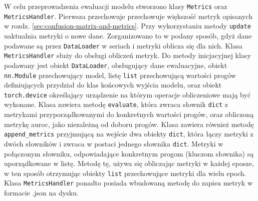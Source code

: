 W celu przeprowadzenia ewaluacji modelu stworzono klasy \texttt{Metrics} oraz \texttt{MetricsHandler}. Pierwsza przechowuje przechowuje większość metryk opisanych w rozdz. \ref{sec:confusion-matrix-and-metrics}. Przy wykorzystaniu metody \texttt{update} uaktualnia metryki o nowe dane. Zorganizowano to w podany sposób, gdyż dane podawane są przez \texttt{DataLoader} w seriach i metryki oblicza się dla nich. Klasa \texttt{MetricsHandler} służy do obsługi obliczeń metryk. Do metody inicjacyjnej klasy podawany jest obiekt \texttt{DataLoader}, obsługujący dane ewaluacyjne, obiekt \texttt{nn.Module} przechowujący model, listę \texttt{list} przechowującą wartości progów definiujących przydział do klas końcowych wyjścia modelu, oraz obiekt \texttt{torch.device} określający urządzenie na którym operacje obliczeniowe mają być wykonane. Klasa zawiera metodę \texttt{evaluate}, która zwraca słownik \texttt{dict} z metrykami przyporządkowanymi do konkretnych wartości progów, oraz obliczoną metrykę auroc, jako niezależną od doboru progów. Klasa zawiera również metodę \texttt{append\_metrics} przyjmującą na wejście dwa obiekty \texttt{dict}, która łączy metryki z dwóch słowników i zwraca w postaci jednego słownika \texttt{dict}. Metryki w połączonym słowniku, odpowiadające konkretnym progom (kluczom słownika) są uporządkowane w listę. Metodę tę, używa się obliczając metryki w każdej eposze, w ten sposób otrzymując obiekty \texttt{list} przechowujące metryki dla wielu epoch. Klasa \texttt{MetricsHandler} ponadto posiada wbudowaną metodę do zapisu metryk w formacie .json na dysku.  


